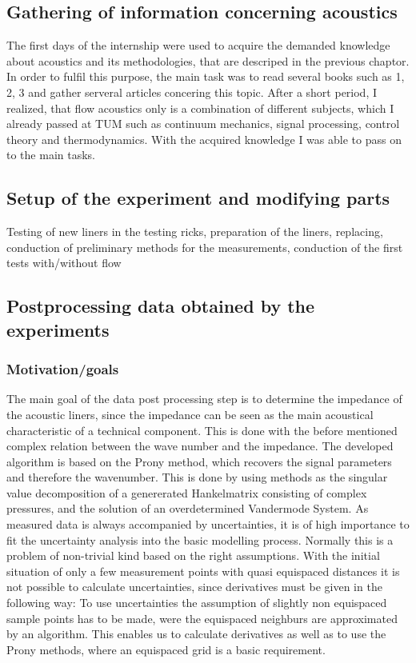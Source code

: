 \documentclass{article}
\begin{document}
\subsection{Gathering of information concerning acoustics } 
The first days of the internship were used to acquire the demanded knowledge about acoustics and its methodologies, that are descriped in the previous chaptor. In order to fulfil this purpose, the main task was to read several books such as 1, 2, 3 and gather serveral articles concering this topic. After a short period, I realized, that flow acoustics only is a combination of different subjects, which I already passed at TUM such as continuum mechanics, signal processing, control theory and thermodynamics. With the acquired knowledge I was able to pass on to the main tasks. 
\subsection{Setup of the experiment and modifying parts}
Testing of new liners in the testing ricks, preparation of the liners, replacing, conduction of preliminary methods for the measurements, conduction of the first tests with/without flow

\subsection{Postprocessing data obtained by the experiments}

\subsubsection{Motivation/goals}
The main goal of the data post processing step is to determine the impedance of the acoustic liners, since the impedance can be seen as the main acoustical characteristic of a technical component. This is done with the before mentioned complex relation between the wave number and the impedance. The developed algorithm is based on the Prony method, which recovers the signal parameters and therefore the wavenumber. This is done by using methods as the singular value decomposition of a genererated Hankelmatrix consisting of complex pressures, and the solution of an overdetermined Vandermode System. 
As measured data is always accompanied by uncertainties, it is of high importance to fit the uncertainty analysis into the basic modelling process. Normally this is a problem of non-trivial kind based on the right assumptions. With the initial situation of only a few measurement points with quasi equispaced distances it is not possible to calculate uncertainties, since derivatives must be given in the following way: 
To use uncertainties the assumption of slightly non equispaced sample points has to be made, were the equispaced neighburs are approximated by an algorithm. This enables us to calculate derivatives as well as to use the Prony methods, where an equispaced grid is a basic requirement.  
\end{document}
